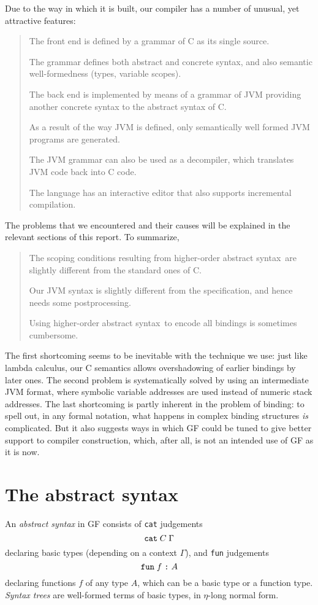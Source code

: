 \documentclass[12pt]{article}
\newcommand{\HOAS}{higher-order abstract syntax}
\newcommand{\empha}[1]{{\em #1}}
\newcommand{\bequ}{\begin{quote}}
\newcommand{\enqu}{\end{quote}}
\begin{document}
Due to the way in which it is built, our compiler has
a number of unusual, yet attractive features:
\bequ
The front end is defined by a grammar of C as its single source.

The grammar defines both abstract and concrete syntax, and also
semantic well-formedness (types, variable scopes).

The back end is implemented by means of a grammar of JVM providing
another concrete syntax to the abstract syntax of C.

As a result of the way JVM is defined, only semantically well formed
JVM programs are generated.

The JVM grammar can also be used as a decompiler, which translates
JVM code back into C code.

The language has an interactive editor that also supports incremental
compilation.
\enqu
The problems that we encountered and their causes will be explained in 
the relevant sections of this report. To summarize,
\bequ
The scoping conditions resulting from \HOAS\ are slightly different
from the standard ones of C.

Our JVM syntax is slightly different from the specification, and
hence needs some postprocessing.

Using \HOAS\ to encode all bindings is sometimes cumbersome.
\enqu
The first shortcoming seems to be inevitable with the technique
we use: just like lambda calculus, our C semantics allows
overshadowing of earlier bindings by later ones. 
The second problem is systematically solved by using
an intermediate JVM format, where symbolic variable addresses
are used instead of numeric stack addresses.
The last shortcoming is partly inherent in the problem of binding:
to spell out, in any formal notation,
what happens in complex binding structures \textit{is}
complicated. But it also suggests ways in which GF could be 
tuned to give better support
to compiler construction, which, after all, is not an intended
use of GF as it is now.








\section{The abstract syntax}

An \empha{abstract syntax} in GF consists of \texttt{cat} judgements
\[
\mbox{\texttt{cat}} \; C \; \Gamma
\]
declaring basic types (depending on a context $\Gamma$), 
and \texttt{fun} judgements 
\[
\mbox{\texttt{fun}} \; f \; \mbox{\texttt{:}} \; A
\]
declaring functions $f$ of any type $A$, which can be a basic type or
a function type.
\empha{Syntax trees} are well-formed terms of basic
types, in $\eta$-long normal form.
\end{document}
